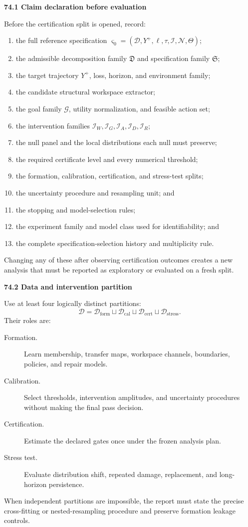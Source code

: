 \documentclass[11pt,letterpaper]{article}
\newcommand{\subtopic}[1]{%
 \vspace{0.45em}
 {\bfseries\color{AccentColor} #1\par}
}
\theoremstyle{plain}
\theoremstyle{definition}
\begin{document}
\subtopic{74.1 Claim declaration before evaluation}

Before the certification split is opened, record:
\begin{enumerate}
\item the full reference specification
 \(\varsigma_0=(\mathcal D,Y^+,\ell,\tau,\mathcal I,\mathcal N,\Theta)\);
\item the admissible decomposition family \(\mathfrak D\) and specification
 family \(\mathfrak S\);
\item the target trajectory \(Y^+\), loss, horizon, and environment family;
\item the candidate structural workspace extractor;
\item the goal family \(\mathcal G\), utility normalization, and feasible
 action set;
\item the intervention families \(\mathcal I_W,\mathcal I_G,\mathcal I_A,
 \mathcal I_D,\mathcal I_R\);
\item the null panel and the local distributions each null must preserve;
\item the required certificate level and every numerical threshold;
\item the formation, calibration, certification, and stress-test splits;
\item the uncertainty procedure and resampling unit; and
\item the stopping and model-selection rules;
\item the experiment family and model class used for identifiability; and
\item the complete specification-selection history and multiplicity rule.
\end{enumerate}
Changing any of these after observing certification outcomes creates a new
analysis that must be reported as exploratory or evaluated on a fresh split.

\subtopic{74.2 Data and intervention partition}

Use at least four logically distinct partitions:
\[
\boxed{
\mathcal D
=
\mathcal D_{\mathrm{form}}
\sqcup
\mathcal D_{\mathrm{cal}}
\sqcup
\mathcal D_{\mathrm{cert}}
\sqcup
\mathcal D_{\mathrm{stress}}.
}
\]
Their roles are:
\begin{description}
\item[Formation.] Learn membership, transfer maps, workspace channels,
 boundaries, policies, and repair models.
\item[Calibration.] Select thresholds, intervention amplitudes, and
 uncertainty procedures without making the final pass decision.
\item[Certification.] Estimate the declared gates once under the frozen
 analysis plan.
\item[Stress test.] Evaluate distribution shift, repeated damage, replacement,
 and long-horizon persistence.
\end{description}
When independent partitions are impossible, the report must state the precise
cross-fitting or nested-resampling procedure and preserve formation leakage
controls.
\end{document}
